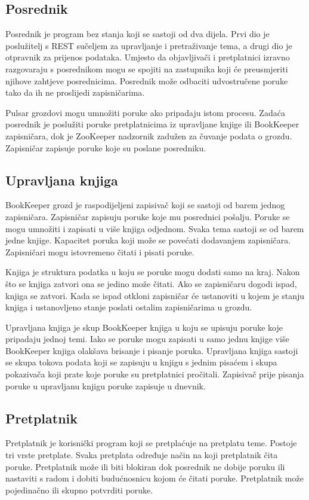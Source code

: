 \documentclass[times, utf8, diplomski, numeric]{fer}
\begin{document}
\subsection{Posrednik}
Posrednik je program bez stanja koji se sastoji od dva dijela. Prvi dio je poslužitelj s REST sučeljem za upravljanje i pretraživanje tema, a drugi dio je otpravnik za prijenos podataka. Umjesto da objavljivači i pretplatnici izravno razgovaraju s posrednikom mogu se spojiti na zastupnika koji će preusmjeriti njihove zahtjeve posrednicima. Posrednik može odbaciti udvostručene poruke tako da ih ne proslijedi zapisničarima.

Pulsar grozdovi mogu umnožiti poruke ako pripadaju istom procesu. Zadaća posrednik je poslužiti poruke pretplatnicima iz upravljane knjige ili BookKeeper zapisničara, dok je ZooKeeper nadzornik zadužen za čuvanje podata o grozdu. Zapisničar zapisuje poruke koje su poslane posredniku.

\subsection{Upravljana knjiga}
BookKeeper grozd je raspodijeljeni zapisivač koji se sastoji od barem jednog zapisničara. Zapisničar zapisuju poruke koje mu posrednici pošalju. Poruke se mogu umnožiti i zapisati u više knjiga odjednom. Svaka tema sastoji se od barem jedne knjige. Kapacitet poruka koji može se povećati dodavanjem zapisničara. Zapisničari mogu istovremeno čitati i pisati poruke.

Knjiga je struktura podatka u koju se poruke mogu dodati samo na kraj. Nakon što se knjiga zatvori ona se jedino može čitati. Ako se zapisničaru dogodi ispad, knjiga se zatvori. Kada se ispad otkloni zapisničar će ustanoviti u kojem je stanju knjiga i ustanovljeno stanje poslati ostalim zapisničarima u grozdu.

Upravljana knjiga je skup BookKeeper knjiga u koju se upisuju poruke koje pripadaju jednoj temi. Iako se poruke mogu zapisati u samo jednu knjige više BookKeeper knjiga olakšava brisanje i pisanje poruka. Upravljana knjiga sastoji se skupa tokova podata koji se zapisuju u knjigu s jednim pisaćem i skupa pokazivača koji prate koje poruke su pretplatnici pročitali. Zapisivač prije pisanja poruke u upravljanu knjigu poruke zapisuje u dnevnik.

\subsection{Pretplatnik}
Pretplatnik je korisnički program koji se pretplaćuje na pretplatu teme. Postoje tri vrste pretplate. Svaka pretplata određuje način na koji pretplatnik čita poruke. Pretplatnik može ili biti blokiran dok posrednik ne dobije poruku ili nastaviti s radom i dobiti budućnosnicu kojom će čitati poruke. Pretplatnik može pojedinačno ili skupno potvrditi poruke.
\end{document}
